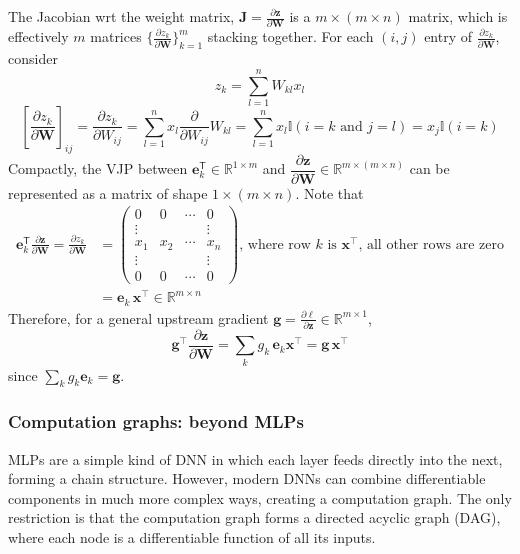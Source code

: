 \documentclass[11pt]{article}
\begin{document}
\begin{itemize}
    The Jacobian wrt the weight matrix, $\mathbf{J} = \frac{\partial \boldsymbol{z}}{\partial \mathbf{W}}$ is a $m \times (m \times n)$ matrix, which is effectively $m$ matrices $\{ \frac{\partial z_k}{\partial \mathbf{W}} \}_{k=1}^m$ stacking together. 
    For each $(i, j)$ entry of $\frac{\partial z_k}{\partial \mathbf{W}}$, consider
    \[
    z_k = \sum_{l=1}^{n} W_{kl} x_l
    \]
    \[
    \left[ \frac{\partial z_k}{\partial \mathbf{W}} \right]_{ij} = \frac{\partial z_k}{\partial W_{ij}} = \sum_{l=1}^{n} x_l \frac{\partial}{\partial W_{ij}} W_{kl} = \sum_{l=1}^{n} x_l \mathbb{I}(i = k \text{ and } j = l) = x_j \mathbb{I}(i = k)
    \]
    Compactly, the VJP between $\boldsymbol{e}_k^\mathsf{T} \in \mathbb{R}^{1 \times m}$ and $\dfrac{\partial \boldsymbol{z}}{\partial \mathbf{W}} \in \mathbb{R}^{m \times (m \times n)}$ can be represented as a matrix of shape $1 \times (m \times n)$. Note that
    \[
    \begin{aligned}
    \boldsymbol{e}_k^\mathsf{T} \frac{\partial \boldsymbol{z}}{\partial \mathbf{W}} = \frac{\partial z_k}{\partial \mathbf{W}} &= 
    \begin{pmatrix}
    0 & 0 & \cdots & 0 \\
    \vdots &  &  & \vdots \\
    x_1 & x_2 & \cdots & x_n \\
    \vdots &  &  & \vdots \\
    0 & 0 & \cdots & 0
    \end{pmatrix}
    , \, \text{where row $k$ is $\boldsymbol{x}^\top$, all other rows are zero} \\
    &= \boldsymbol{e}_k \, \boldsymbol{x}^\top \in \mathbb{R}^{m \times n}
    \end{aligned}
    \]
    Therefore, for a general upstream gradient $\mathbf{g} = \frac{\partial \ell}{\partial \mathbf{z}} \in \mathbb{R}^{m \times 1}$,
    \[
    \mathbf{g}^\top \frac{\partial \mathbf{z}}{\partial \mathbf{W}} = \sum_{k} g_k\, \mathbf{e}_k \mathbf{x}^\top = \mathbf{g}\,\mathbf{x}^\top
    \]
    since $\sum_k g_k \mathbf{e}_k = \mathbf{g}$.
\end{itemize}

\subsubsection{Computation graphs: beyond MLPs}
MLPs are a simple kind of DNN in which each layer feeds directly into the next, forming a chain structure. 
However, modern DNNs can combine differentiable components in much more complex ways, creating a computation graph. 
The only restriction is that the computation graph forms a directed acyclic graph (DAG), where each node is a differentiable function of all its inputs.
\end{document}
